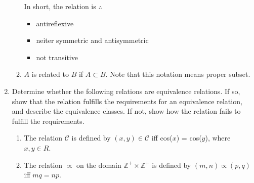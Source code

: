 \documentclass{article}
\newcommand{\Z}{\mathbb{Z}}
\begin{document}
\begin{enumerate}
\begin{enumerate}
In short, the relation is $\therefore$ 
\begin{itemize}
    \item antireflexive
    \item neiter symmetric and antisymmetric
    \item not transitive
\end{itemize}

\pagebreak %

    \item $A$ is related to $B$ if $A \subset B$. Note 
    that this notation means proper subset.
\end{enumerate}

\pagebreak %

\item Determine whether the following relations are equivalence relations. 
If so, show that the relation fulfills the requirements for an equivalence relation, 
and describe the equivalence classes. If not, show how the relation fails to fulfill 
the requirements.

\begin{enumerate}
    \item The relation $\mathcal{C}$ is defined by $(x,y)\in \mathcal{C}$ iff cos($x$) = cos($y$), where $x,y \in R$.
    \item The relation $\varpropto$ on the domain $\Z^+\times\Z^+$ is defined by $(m,n) \varpropto (p,q)$ iff $mq = np$.
\end{enumerate}

\end{enumerate}
\end{document}
